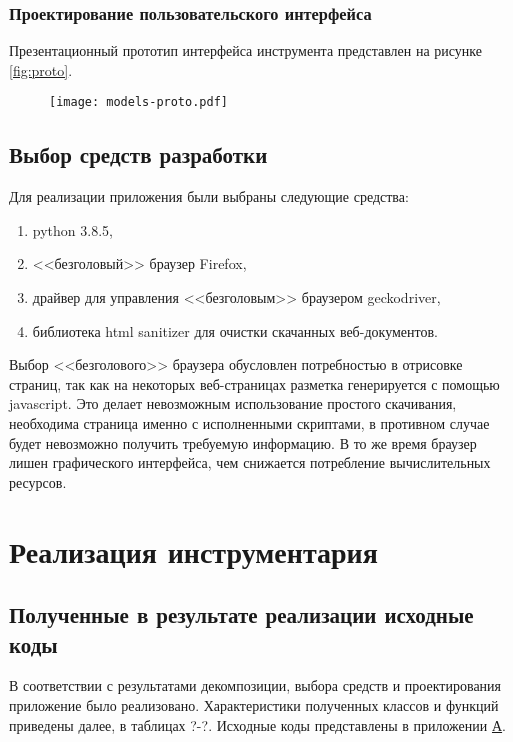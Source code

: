 \documentclass[../main]{subfiles}
\begin{document}
\subsubsection{Проектирование пользовательского интерфейса}

Презентационный прототип интерфейса инструмента представлен на рисунке \ref{fig:proto}.

\begin{figure}[H]
    \centering
    {\texttt{[image: models-proto.pdf]}}
    \vspace{-\baselineskip}
\end{figure}

\subsection{Выбор средств разработки}
Для реализации приложения были выбраны следующие средства:
\begin{enumerate}
    \item python 3.8.5,
    \item <<безголовый>> браузер Firefox,
    \item драйвер для управления <<безголовым>> браузером geckodriver,
    \item библиотека html sanitizer для очистки скачанных веб-документов.
\end{enumerate}
Выбор <<безголового>> браузера обусловлен потребностью в отрисовке страниц, так как на некоторых веб-страницах разметка генерируется с помощью javascript. Это делает невозможным использование простого скачивания, не\-обходима страница именно с исполненными скриптами, в противном случае будет невозможно получить требуемую информацию. В то же время браузер лишен графического интерфейса, чем снижается потребление вычислительных ресурсов.

\newpage
\section{Реализация инструментария}

\subsection{Полученные в результате реализации исходные коды}
В соответствии с результатами декомпозиции, выбора средств и проектирования приложение было реализовано. Характеристики полученных классов и функций приведены далее, в таблицах ?-?. Исходные коды представлены в приложении \hyperref[sec:appendix]{А}.
\end{document}
